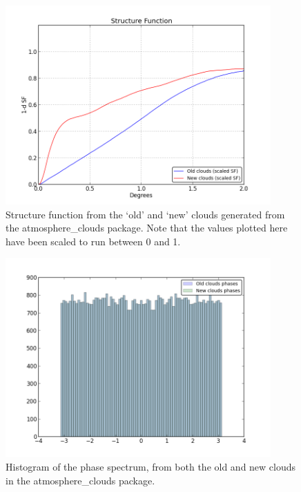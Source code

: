 \documentclass[11pt,preprint]{aastex}
\begin{document}
\begin{figure}[htbp]
\centering
\includegraphics[width=4in]{clouds_sf}
\caption{{\small
Structure function from the `old' and `new' clouds generated from the atmosphere\_clouds package. Note that the values plotted here have been scaled to run between 0 and 1.}}
\label{fig:clouds_sf}
\end{figure}

\begin{figure}[htpb]
\centering
\includegraphics[width=4in]{clouds_phasehist}
\caption{{\small
Histogram of the phase spectrum, from both the old and new clouds in the atmosphere\_clouds package. }}
\label{fig:clouds_phasehist}
\end{figure}
\end{document}
